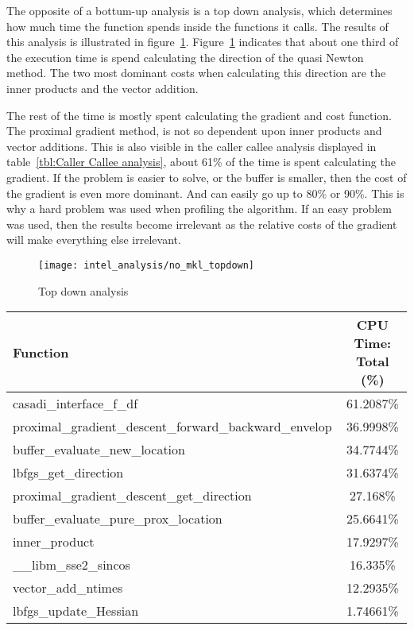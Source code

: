 The opposite of a bottum-up  analysis is a top down analysis, which determines how  much time the  function spends inside the functions it calls. The results of this analysis is illustrated in figure~\ref{fig:no mkl top down}. Figure~\ref{fig:no mkl top down} indicates that about one third of the execution time is spend calculating the direction of the quasi Newton method. The two most dominant costs when calculating this direction are the inner products and the vector addition.

The rest of the time is mostly spent calculating the gradient and cost function. The proximal gradient method, is not so dependent upon inner products and vector additions. This is also visible in the caller callee analysis displayed in table~\ref{tbl:Caller Callee analysis}, about 61\% of the time is spent calculating the gradient. If the problem is easier to solve, or the buffer is smaller, then the cost of the gradient is even more dominant. And can easily go up to 80\% or 90\%. This is why a hard problem was used when profiling the algorithm. If an easy problem was used, then the results become irrelevant as the relative costs of the gradient will make everything else irrelevant.

\begin{figure}[H]
	\centering
	\texttt{[image: intel\_analysis/no\_mkl\_topdown]}
	\caption{Top down analysis}
	\label{fig:no mkl top down}
\end{figure}

\begin{center}
	\begin{tabular}{| l | c |}
		\hline
		Function&CPU Time: Total (\%) \\
		\hline
		casadi\_interface\_f\_df&61.2087\% \\
		proximal\_gradient\_descent\_forward\_backward\_envelop&36.9998\% \\
		buffer\_evaluate\_new\_location&34.7744\% \\
		lbfgs\_get\_direction&31.6374\% \\
		proximal\_gradient\_descent\_get\_direction&27.168\% \\
		buffer\_evaluate\_pure\_prox\_location&25.6641\% \\
		inner\_product&17.9297\% \\
		\_\_libm\_sse2\_sincos&16.335\% \\
		vector\_add\_ntimes&12.2935\% \\
		lbfgs\_update\_Hessian&1.74661\% \\
		\hline
	\end{tabular}
	\label{tbl:Caller Callee analysis}
\end{center}

